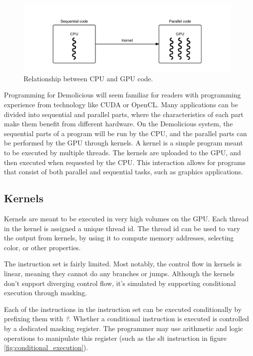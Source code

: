 \begin{figure}[H]
	\centering
	\includegraphics[width=\textwidth]{../system_overview/diagrams/programming_model_cpu_gpu.png}
	\caption{Relationship between CPU and GPU code.}
	\label{fig:programming_model_cpu_gpu}
\end{figure}

Programming for Demolicious will seem familiar for readers with programming experience from technology like CUDA or OpenCL. 
Many applications can be divided into sequential and parallel parts,
where the characteristics of each part make them benefit from different hardware.
On the Demolicious system, the sequential parts of a program will be run by the CPU, and the parallel parts can be performed by the GPU through kernels.
A kernel is a simple program meant to be executed by multiple threads.
The kernels are uploaded to the GPU, and then executed when requested by the CPU.
This interaction allows for programs that consist of both parallel and sequential tasks, such as graphics applications.

\subsection{Kernels}
Kernels are meant to be executed in very high volumes on the GPU.
Each thread in the kernel is assigned a unique thread id.
The thread id can be used to vary the output from kernels, 
by using it to compute memory addresses, selecting color, or other properties.

The instruction set is fairly limited.
Most notably, the control flow in kernels is linear, meaning they cannot do any branches or jumps.
Although the kernels don't support diverging control flow,
it's simulated by supporting conditional execution through masking.

Each of the instructions in the instruction set can be executed conditionally by prefixing them with \textit{?}.
Whether a conditional instruction is executed is controlled by a dedicated masking register.
The programmer may use arithmetic and logic operations to manipulate this register (such as the slt instruction in figure \ref{fig:conditional_execution}).

